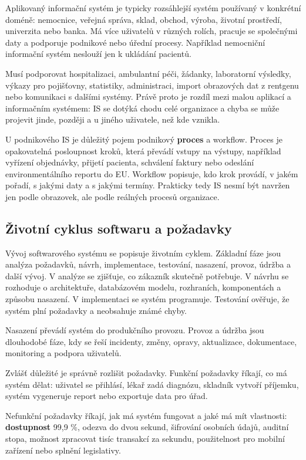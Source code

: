 \documentclass[11pt,a4paper]{article}
\begin{document}
Aplikovaný informační systém je typicky rozsáhlejší systém používaný v konkrétní doméně: nemocnice, veřejná správa, sklad, obchod, výroba, životní prostředí, univerzita nebo banka. Má více uživatelů v různých rolích, pracuje se společnými daty a podporuje podnikové nebo úřední procesy. Například nemocniční informační systém neslouží jen k ukládání pacientů.

Musí podporovat hospitalizaci, ambulantní péči, žádanky, laboratorní výsledky, výkazy pro pojišťovny, statistiky, administraci, import obrazových dat z rentgenu nebo komunikaci s dalšími systémy. Právě proto je rozdíl mezi malou aplikací a informačním systémem: IS se dotýká chodu celé organizace a chyba se může projevit jinde, později a u jiného uživatele, než kde vznikla.

U podnikového IS je důležitý pojem podnikový \textbf{proces} a workflow. Proces je opakovatelná posloupnost kroků, která převádí vstupy na výstupy, například vyřízení objednávky, přijetí pacienta, schválení faktury nebo odeslání environmentálního reportu do EU. Workflow popisuje, kdo krok provádí, v jakém pořadí, s jakými daty a s jakými termíny. Prakticky tedy IS nesmí být navržen jen podle obrazovek, ale podle reálných procesů organizace.

\subsection*{Životní cyklus softwaru a požadavky}

Vývoj softwarového systému se popisuje životním cyklem. Základní fáze jsou analýza požadavků, návrh, implementace, testování, nasazení, provoz, údržba a další vývoj. V analýze se zjišťuje, co zákazník skutečně potřebuje. V návrhu se rozhoduje o architektuře, databázovém modelu, rozhraních, komponentách a způsobu nasazení. V implementaci se systém programuje. Testování ověřuje, že systém plní požadavky a neobsahuje známé chyby.

Nasazení převádí systém do produkčního provozu. Provoz a údržba jsou dlouhodobé fáze, kdy se řeší incidenty, změny, opravy, aktualizace, dokumentace, monitoring a podpora uživatelů.

Zvlášť důležité je správně rozlišit požadavky. Funkční požadavky říkají, co má systém dělat: uživatel se přihlásí, lékař zadá diagnózu, skladník vytvoří příjemku, systém vygeneruje report nebo exportuje data pro úřad.

Nefunkční požadavky říkají, jak má systém fungovat a jaké má mít vlastnosti: \textbf{dostupnost} 99,9 \%, odezva do dvou sekund, šifrování osobních údajů, auditní stopa, možnost zpracovat tisíc transakcí za sekundu, použitelnost pro mobilní zařízení nebo splnění legislativy.
\end{document}
